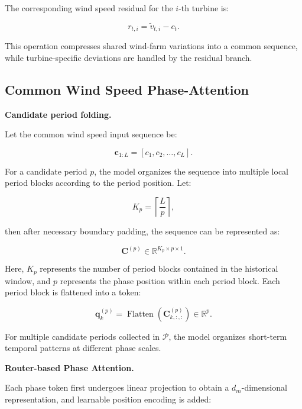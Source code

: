 The corresponding wind speed residual for the $i$-th turbine is:

\begin{equation}
r_{t,i} = \tilde{v}_{t,i}-c_t.
\end{equation}

This operation compresses shared wind-farm variations into a common sequence, while turbine-specific deviations are handled by the residual branch.

\subsection{Common Wind Speed Phase-Attention}

\textbf{Candidate period folding.}

Let the common wind speed input sequence be:

\begin{equation}
\mathbf{c}_{1:L} = [c_1, c_2, \ldots, c_L].
\end{equation}

For a candidate period $p$, the model organizes the sequence into multiple local period blocks according to the period position. Let:

\begin{equation}
K_p = \left\lceil\frac{L}{p}\right\rceil,
\end{equation}

then after necessary boundary padding, the sequence can be represented as:

\begin{equation}
\mathbf{C}^{(p)} \in \mathbb{R}^{K_p\times p\times 1}.
\end{equation}

Here, $K_p$ represents the number of period blocks contained in the historical window, and $p$ represents the phase position within each period block. Each period block is flattened into a token:

\begin{equation}
\mathbf{q}^{(p)}_k = \operatorname{Flatten} \left( \mathbf{C}^{(p)}_{k,:,:} \right) \in \mathbb{R}^{p}.
\end{equation}

For multiple candidate periods collected in $\mathcal{P}$, the model organizes short-term temporal patterns at different phase scales.

\textbf{Router-based Phase Attention.}

Each phase token first undergoes linear projection to obtain a $d_m$-dimensional representation, and learnable position encoding is added:

